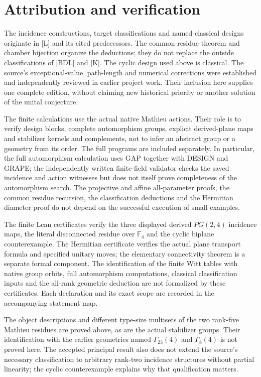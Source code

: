 \section{Attribution and verification}
The incidence constructions, target classifications and named
classical designs originate in [L] and its cited predecessors. The
common residue theorem and chamber bijection organize the deductions;
they do not replace the outside classifications of [BDL] and [K]. The
cyclic design used above is classical. The source's exceptional-value,
path-length and numerical corrections were established and independently
reviewed in earlier project work. Their inclusion here supplies one
complete edition, without claiming new historical priority or another
solution of the unital conjecture.

The finite calculations use the actual native Mathieu actions. Their
role is to verify design blocks, complete automorphism groups, explicit
derived-plane maps and stabilizer kernels and complements, not to infer
an abstract group or a geometry from its order. The full programs are
included separately. In particular, the full automorphism calculation
uses GAP together with DESIGN and GRAPE; the independently written
finite-field validator checks the saved incidence and action witnesses
but does not itself prove completeness of the automorphism search.
The projective and affine all-parameter proofs, the common residue
recursion, the classification deductions and the Hermitian diameter
proof do not depend on the successful execution of small examples.

The finite Lean certificates verify the three displayed derived
$PG(2,4)$ incidence maps, the literal disconnected residue over
$\mathbb F_4$ and the cyclic biplane counterexample. The Hermitian
certificate verifies the actual plane transport formula and specified
unitary moves; the elementary connectivity theorem is a separate
formal component. The identification of the finite Witt tables with
native group orbits, full automorphism computations, classical
classification inputs and the all-rank geometric deduction are not
formalized by these certificates. Each declaration and its exact scope
are recorded in the accompanying statement map.

The object descriptions and different type-size multisets of the two
rank-five Mathieu residues are proved above, as are the actual
stabilizer groups. Their identification with the earlier geometries
named $\Gamma_{23}(4)$ and $\Gamma_8(4)$ is not proved here. The accepted
principal result also does not extend the source's necessary
classification to arbitrary rank-two incidence structures without
partial linearity; the cyclic counterexample explains why that
qualification matters.

